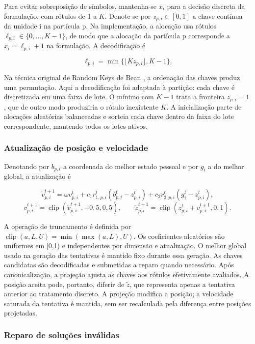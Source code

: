 \documentclass[12pt,a4paper]{article}
\begin{document}
Para evitar sobreposição de símbolos, mantenha-se \(x_i\) para a decisão discreta da
formulação, com rótulos de 1 a $K$. Denote-se por \(z_{p,i}\in[0,1]\) a chave contínua
da unidade i na partícula p. Na implementação, a alocação usa rótulos
\(\ell_{p,i}\in\{0,\ldots,K-1\}\), de modo que a alocação da partícula p corresponde a
\(x_i=\ell_{p,i}+1\) na formulação. A decodificação é

\[
\ell_{p,i}=\min\{\lfloor Kz_{p,i}\rfloor,K-1\}.
\]

Na técnica original de Random Keys de Bean \cite{bean1994}, a ordenação das
chaves produz uma permutação. Aqui a decodificação foi adaptada à partição:
cada chave é discretizada em uma faixa de lote. O mínimo com $K-1$ trata a
fronteira $z_{p,i}=1$, que de outro modo produziria o rótulo inexistente $K$.
A inicialização parte de alocações aleatórias balanceadas e sorteia cada chave
dentro da faixa do lote correspondente, mantendo todos os lotes ativos.

\subsubsection*{Atualização de posição e velocidade}

Denotando por \(b_{p,i}\) a coordenada do melhor estado pessoal e por \(g_i\) a do
melhor global, a atualização é

\[
\widetilde v_{p,i}^{t+1}=\omega v_{p,i}^{t}
+c_1r_{1,p,i}^{t}(b_{p,i}^{t}-z_{p,i}^{t})
+c_2r_{2,p,i}^{t}(g_i^{t}-z_{p,i}^{t}),
\]
\[
v_{p,i}^{t+1}=\operatorname{clip}(\widetilde v_{p,i}^{t+1},-0{,}5,0{,}5),
\qquad
\widetilde z_{p,i}^{t+1}=\operatorname{clip}(z_{p,i}^{t}+v_{p,i}^{t+1},0,1).
\]

A operação de truncamento é definida por
\(\operatorname{clip}(a,L,U)=\min(\max(a,L),U)\). Os coeficientes aleatórios são
uniformes em [0,1) e independentes por dimensão e atualização. O melhor global usado na
geração das tentativas é mantido fixo durante essa geração. As chaves candidatas são
decodificadas e submetidas a reparo quando necessário. Após canonicalização, a projeção
ajusta as chaves aos rótulos efetivamente avaliados. A posição aceita pode, portanto,
diferir de \(\widetilde z\), que representa apenas a tentativa anterior ao tratamento
discreto. A projeção modifica a posição; a velocidade saturada da tentativa é mantida,
sem ser recalculada pela diferença entre posições projetadas.

\subsubsection*{Reparo de soluções inválidas}
\end{document}
